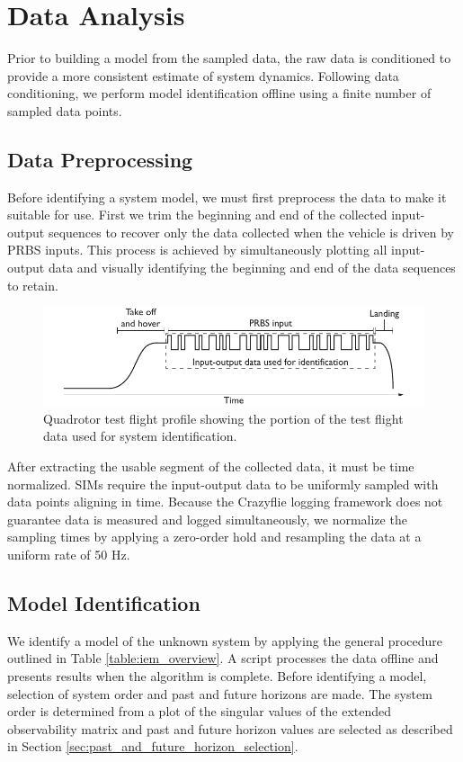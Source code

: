 \section{Data Analysis}
Prior to building a model from the sampled data, the raw data is conditioned to provide a more consistent estimate of system dynamics. Following data conditioning, we perform model identification offline using a finite number of sampled data points.


\subsection{Data Preprocessing}
Before identifying a system model, we must first preprocess the data to make it suitable for use. First we trim the beginning and end of the collected input-output sequences to recover only the data collected when the vehicle is driven by PRBS inputs. This process is achieved by simultaneously plotting all input-output data and visually identifying the beginning and end of the data sequences to retain.
\begin{figure}[htb!]
	\centering
	\includegraphics{../fig/test_flight_profile.pdf}
	\caption{Quadrotor test flight profile showing the portion of the test flight data used for system identification.}
	\label{fig:test_flight_profile}
\end{figure}

After extracting the usable segment of the collected data, it must be time normalized. SIMs require the input-output data to be uniformly sampled with data points aligning in time. Because the Crazyflie logging framework does not guarantee data is measured and logged simultaneously, we normalize the sampling times by applying a zero-order hold and resampling the data at a uniform rate of 50 Hz.


\subsection{Model Identification}
We identify a model of the unknown system by applying the general procedure outlined in Table \ref{table:iem_overview}. A \matlab script processes the data offline and presents results when the algorithm is complete. Before identifying a model, selection of system order and past and future horizons are made. The system order is determined from a plot of the singular values of the extended observability matrix and past and future horizon values are selected as described in Section \ref{sec:past_and_future_horizon_selection}.

